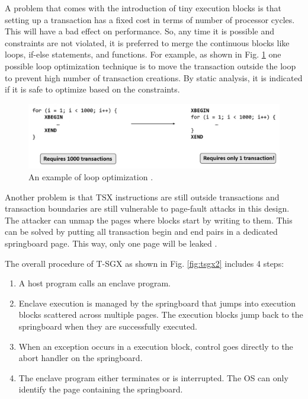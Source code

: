 A problem that comes with the introduction of tiny execution blocks is that setting up a transaction has a fixed cost in terms of number of processor cycles. This will have a bad effect on performance. So, any time it is possible and constraints are not violated, it is preferred to merge the continuous blocks like loops, if-else statements, and functions. For example, as shown in Fig. \ref{fig:tsgxloop} one possible loop optimization technique is to move the transaction outside the loop to prevent high number of transaction creations. By static analysis, it is indicated if it is safe to optimize based on the constraints.

\begin{figure}
	\includegraphics[scale=0.2]{images/tsgxloop}
	\caption{An example of loop optimization \cite{heisenberg}.}
	\label{fig:tsgxloop}
\end{figure}

Another problem is that TSX instructions are still outside transactions and transaction boundaries are still vulnerable to page-fault attacks in this design. The attacker can unmap the pages where blocks start by writing to them. This can be solved by putting all transaction begin and end pairs in a dedicated springboard page. This way, only one page will be leaked \cite{tsgx}.

The overall procedure of T-SGX as shown in Fig. \ref{fig:tsgx2} includes 4 steps:
\begin{enumerate}
	\item A host program calls an enclave program.
	\item Enclave execution is managed by the springboard that jumps into execution blocks scattered across multiple pages. The execution blocks jump back to the springboard when they are	successfully executed.
	\item When an exception occurs in a execution block, control goes directly to the abort handler on the springboard.
	\item The enclave program either terminates or is interrupted. The OS can only identify the page containing the springboard.
\end{enumerate}

